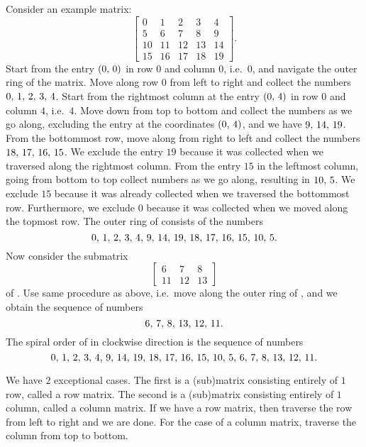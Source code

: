 Consider an example matrix:
\begin{equation}
\label{eqn:spiral:example_matrix}
\begin{bmatrix}
0  & 1  & 2  & 3  & 4  \\[4pt]
5  & 6  & 7  & 8  & 9  \\[4pt]
10 & 11 & 12 & 13 & 14 \\[4pt]
15 & 16 & 17 & 18 & 19
\end{bmatrix}.
\end{equation}
Start from the entry $\left( {0},\, {0} \right)$ in row $0$ and column $0$,
i.e.~$0$, and navigate the outer ring of the matrix.  Move along row
$0$ from left to right and collect the numbers
${0},\, {1},\, {2},\, {3},\, {4}$.  Start from the rightmost column at the
entry $\left( {0},\, {4} \right)$ in row $0$ and column $4$, i.e.~$4$.  Move down
from top to bottom and collect the numbers as we go along, excluding
the entry at the coordinates $\left( {0},\, {4} \right)$, and we have
${9},\, {14},\, {19}$.  From the bottommost row, move along from right
to left and collect the numbers ${18},\, {17},\, {16},\, {15}$.  We exclude
the entry $19$ because it was collected when we traversed along the
rightmost column.  From the entry $15$ in the leftmost column, going
from bottom to top collect numbers as we go along, resulting in
${10},\, {5}$.  We exclude $15$ because it was already collected
when we traversed the bottommost row.  Furthermore, we exclude $0$
because it was collected when we moved along the topmost row.  The
outer ring of  consists of the
numbers
\[
{0},\, {1},\, {2},\, {3},\, {4},\,
{9},\, {14},\, {19},\,
{18},\, {17},\, {16},\, {15},\,
{10},\, {5}.
\]
Now consider the submatrix
\begin{equation}
\label{eqn:spiral:example_matrix:submatrix}
\begin{bmatrix}
6  & 7  & 8  \\[4pt]
11 & 12 & 13
\end{bmatrix}
\end{equation}
of .  Use same procedure as above,
i.e.~move along the outer ring of
, and we obtain the
sequence of numbers
\[
{6},\, {7},\, {8},\,
{13},\, {12},\, {11}.
\]
The spiral order of  in clockwise
direction is the sequence of numbers
\[
{0},\, {1},\, {2},\, {3},\, {4},\,
{9},\, {14},\, {19},\,
{18},\, {17},\, {16},\, {15},\,
{10},\, {5},\,
{6},\, {7},\, {8},\,
{13},\, {12},\, {11}.
\]

We have $2$ exceptional cases.  The first is a (sub)matrix consisting
entirely of $1$ row, called a row matrix.  The second is a (sub)matrix
consisting entirely of $1$ column, called a column matrix.  If we have
a row matrix, then traverse the row from left to right and we are
done.  For the case of a column matrix, traverse the column from top
to bottom.
